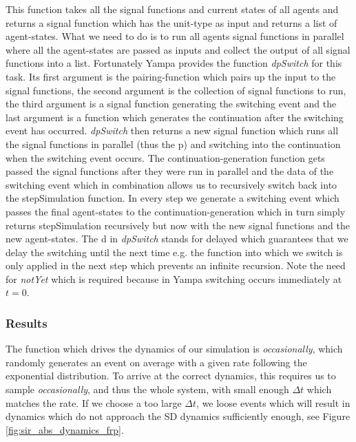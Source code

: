 This function takes all the signal functions and current states of all agents and returns a signal function which has the unit-type as input and returns a list of agent-states. What we need to do is to run all agents signal functions in parallel where all the agent-states are passed as inputs and collect the output of all signal functions into a list. Fortunately Yampa provides the function \textit{dpSwitch} for this task. Its first argument is the pairing-function which pairs up the input to the signal functions, the second argument is the collection of signal functions to run, the third argument is a signal function generating the switching event and the last argument is a function which generates the continuation after the switching event has occurred.
\textit{dpSwitch} then returns a new signal function which runs all the signal functions in parallel (thus the p) and switching into the continuation when the switching event occurs. The continuation-generation function gets passed the signal functions after they were run in parallel and the data of the switching event which in combination allows us to recursively switch back into the stepSimulation function. In every step we generate a switching event which passes the final agent-states to the continuation-generation which in turn simply returns stepSimulation recursively but now with the new signal functions and the new agent-states. 
The d in \textit{dpSwitch} stands for delayed which guarantees that we delay the switching until the next time e.g. the function into which we switch is only applied in the next step which prevents an infinite recursion. Note the need for \textit{notYet} which is required because in Yampa switching occurs immediately at $t = 0$.

\subsubsection{Results}
The function which drives the dynamics of our simulation is \textit{occasionally}, which randomly generates an event on average with a given rate following the exponential distribution. To arrive at the correct dynamics, this requires us to sample \textit{occasionally}, and thus the whole system, with small enough $\Delta t$ which matches the rate. If we choose a too large $\Delta t$, we loose events which will result in dynamics which do not approach the SD dynamics sufficiently enough, see Figure \ref{fig:sir_abs_dynamics_frp}.

